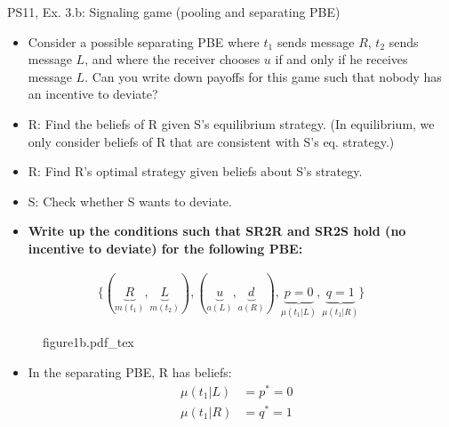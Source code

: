 \begin{frame}{PS11, Ex. 3.b: Signaling game (pooling and separating PBE)}
    \begin{itemize}
        \item[(b)] Consider a possible separating PBE where $t_1$ sends message $R$, $t_2$ sends message $L$, and where the receiver chooses $u$ if and only if he receives message $L$. Can you write down payoffs for this game such that nobody has an incentive to deviate?
    \end{itemize} \vspace{-8pt}
    \begin{multicols}{2}
      \begin{itemize}
        \item[SR3:] R: Find the beliefs of R given S's equilibrium strategy. (In equilibrium, we only consider beliefs of R that are consistent with S's eq. strategy.)
        \item[SR2R:] R: Find R's optimal strategy given beliefs about S's strategy.
        \item[SR2S:] S: Check whether S wants to deviate.
        \item[PBE:]  \textbf{Write up the conditions such that SR2R and SR2S hold (no incentive to deviate) for the following PBE:}
      \end{itemize}\vspace{-14pt}
      \begin{align*}
        \{(\underbrace{R}_{m(t_1)},\underbrace{L}_{m(t_2)}),(\underbrace{u}_{a(L)},\underbrace{d}_{a(R)}),\underbrace{p=0}_{\mu(t_1|L)},\underbrace{q=1}_{\mu(t_1|R)}\}
      \end{align*}
      \vfill\null\columnbreak
      \begin{figure}[!h]
        \center\def\svgwidth{\columnwidth}
        {figure1b.pdf_tex}
      \end{figure} \vspace{-8pt}
      \begin{itemize}
        \item[SR3:] In the separating PBE, R has beliefs:\vspace{-8pt}
        \begin{align*}
          \mu(t_1|L)&=p^*=0&\\
          \mu(t_1|R)&=q^*=1
        \end{align*}
      \end{itemize}
      \vfill\null \columnbreak
      \vfill
    \end{multicols}
\end{frame}
